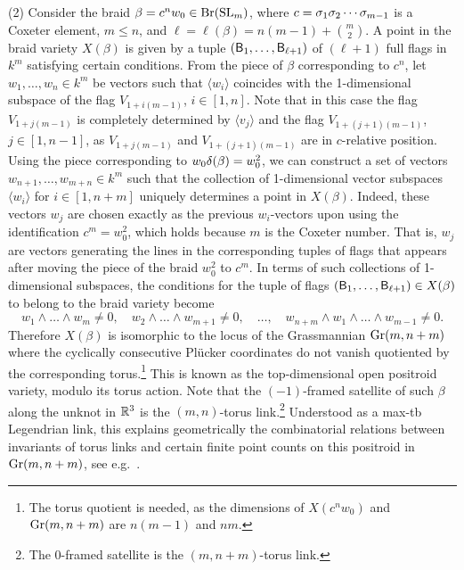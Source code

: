 \begin{example}
\noindent (2) Consider the braid $\beta=c^nw_0\in\text{Br}(\operatorname{SL}_{m})$, where $c=\sigma_1\sigma_2\cdots \sigma_{m-1}$ is a Coxeter element, $m\leq n$, and $\ell=\ell(\beta)=n(m-1)+{m\choose 2}$. A point in the braid variety $X(\beta)$ is given by a tuple $(\mathsf{B}_1,\ldots,\mathsf{B}_{\ell+1})$ of $(\ell+1)$ full flags in $k^{m}$ satisfying certain conditions. From the piece of $\beta$ corresponding to $c^n$, let $w_1,\ldots,w_n\in k^m$ be vectors such that $\langle w_i\rangle$ coincides with the 1-dimensional subspace of the flag $V_{1+i(m-1)}$, $i\in[1,n]$. Note that in this case the flag $V_{1+j(m-1)}$ is completely determined by $\langle v_j\rangle$ and the flag $V_{1+(j+1)(m-1)}$, $j\in[1,n-1]$, as $V_{1+j(m-1)}$ and $V_{1+(j+1)(m-1)}$ are in $c$-relative position. Using the piece corresponding to $w_0\delta(\beta)=w_0^2$, we can construct a set of vectors $w_{n+1},\ldots, w_{m+n}\in k^m$ such that the collection of 1-dimensional vector subspaces $\langle w_i\rangle$ for $i\in[1,n+m]$ uniquely determines a point in $X(\beta)$. Indeed, these vectors $w_j$ are chosen exactly as the previous $w_i$-vectors upon using the identification $c^m=w_0^2$, which holds because $m$ is the Coxeter number. That is, $w_j$ are vectors generating the lines in the corresponding tuples of flags that appears after moving the piece of the braid $w_0^2$ to $c^m$. In terms of such collections of 1-dimensional subspaces, the conditions for the tuple of flags $(\mathsf{B}_1,\ldots,\mathsf{B}_{\ell+1})\in X(\beta)$ to belong to the braid variety become
$$w_1\wedge\ldots\wedge w_m\neq 0,\quad w_2\wedge\ldots\wedge w_{m+1}\neq 0,\quad\ldots,\quad w_{n+m}\wedge w_1\wedge\ldots\wedge w_{m-1}\neq 0.$$
Therefore $X(\beta)$ is isomorphic to the locus of the Grassmannian $\operatorname{Gr}(m,n+m)$ where the cyclically consecutive Pl\"ucker coordinates do not vanish quotiented by the corresponding torus.\footnote{The torus quotient is needed, as the dimensions of $X(c^nw_0)$ and $\operatorname{Gr}(m,n+m)$ are $n(m-1)$ and $nm$.} This is known as the top-dimensional open positroid variety, modulo its torus action. Note that the $(-1)$-framed satellite of such $\beta$ along the unknot in $\mathbb{R}^3$ is the $(m,n)$-torus link.\footnote{The 0-framed satellite is the $(m,n+m)$-torus link.} Understood as a max-tb Legendrian link, this explains geometrically the combinatorial relations between invariants of torus links and certain finite point counts on this positroid in $\operatorname{Gr}(m,n+m)$, see e.g.~\cite{LamGalashin_Catalan,GL2023}.\sbs
\end{example}

